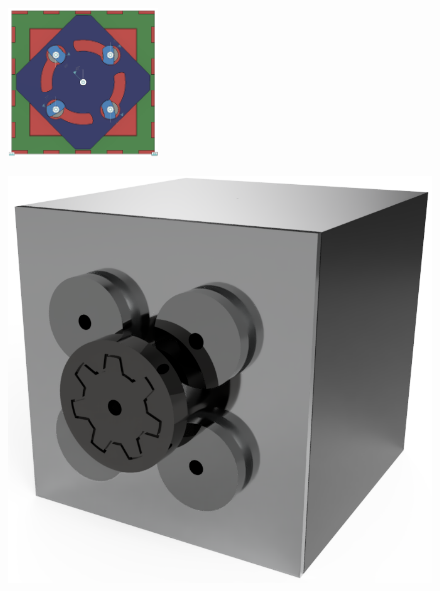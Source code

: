 \begin{figure}[htbp]
    \includegraphics[width=150]{kapitoly/obrazky/M2/mechanizmus_zamceno.png}
    \label{fig:M1}
\end{figure}

\begin{figure}[htbp]
    \centering
    \includegraphics[width=\textwidth]{kapitoly/obrazky/M2/predni_render.PNG}
    \label{fig:M1.0}
\end{figure}


\newpage